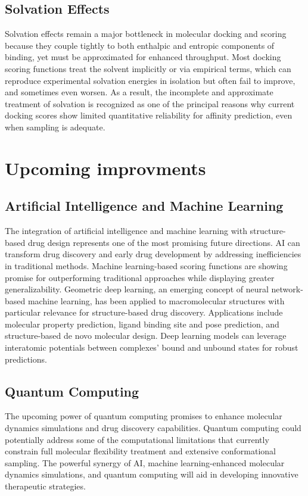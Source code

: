 \subsection{Solvation Effects}
Solvation effects remain a major bottleneck in molecular docking and scoring because they couple tightly to both enthalpic and entropic components of binding, yet must be approximated for enhanced throughput.  Most docking scoring functions treat the solvent implicitly or via empirical terms, which can reproduce experimental solvation energies in isolation but often fail to improve, and sometimes even worsen.  As a result, the incomplete and approximate treatment of solvation is recognized as one of the principal reasons why current docking scores show limited quantitative reliability for affinity prediction, even when sampling is adequate\cite{CH1_24}.

\section{Upcoming improvments}
\subsection{Artificial Intelligence and Machine Learning}
The integration of artificial intelligence and machine learning with structure-based drug design represents one of the most promising future directions. AI can transform drug discovery and early drug development by addressing inefficiencies in traditional methods. Machine learning-based scoring functions are showing promise for outperforming traditional approaches while displaying greater generalizability.
Geometric deep learning, an emerging concept of neural network-based machine learning, has been applied to macromolecular structures with particular relevance for structure-based drug discovery. Applications include molecular property prediction, ligand binding site and pose prediction, and structure-based de novo molecular design. Deep learning models can leverage interatomic potentials between complexes’ bound and unbound states for robust predictions.

\subsection{Quantum Computing}
The upcoming power of quantum computing promises to enhance molecular dynamics simulations and drug discovery capabilities. Quantum computing could potentially address some of the computational limitations that currently constrain full molecular flexibility treatment and extensive conformational sampling. The powerful synergy of AI, machine learning-enhanced molecular dynamics simulations, and quantum computing will aid in developing innovative therapeutic strategies.


